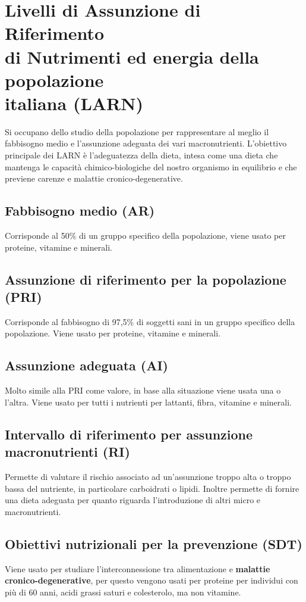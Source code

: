 \documentclass[10pt]{article}
\begin{document}
\section{Livelli di Assunzione di Riferimento\\ di Nutrimenti ed energia della popolazione\\ italiana (LARN)} 
Si occupano dello studio della popolazione per rappresentare al meglio il fabbisogno medio e l'assunzione adeguata dei vari macronutrienti. L'obiettivo principale dei LARN è l'adeguatezza della dieta, intesa come una dieta che mantenga le capacità chimico-biologiche del nostro organismo in equilibrio e che previene carenze e malattie cronico-degenerative.
\subsection{Fabbisogno medio (AR)}
Corrisponde al 50\% di un gruppo specifico della popolazione, viene usato per proteine, vitamine e minerali. 
\subsection{Assunzione di riferimento per la popolazione (PRI)}
Corrisponde al fabbisogno di 97,5\% di soggetti sani in un gruppo specifico della popolazione. Viene usato per proteine, vitamine e minerali. 
\subsection{Assunzione adeguata (AI)}
Molto simile alla PRI come valore, in base alla situazione viene usata una o l'altra. Viene usato per tutti i nutrienti per lattanti, fibra, vitamine e minerali.
\subsection{Intervallo di riferimento per assunzione macronutrienti (RI)}
Permette di valutare il rischio associato ad un'assunzione troppo alta o troppo bassa del nutriente, in particolare carboidrati o lipidi. Inoltre permette di fornire una dieta adeguata per quanto riguarda l'introduzione di altri micro e macronutrienti.
\subsection{Obiettivi nutrizionali per la prevenzione (SDT)}
Viene usato per studiare l'interconnessione tra alimentazione e \textbf{malattie cronico-degenerative}, per questo vengono usati per proteine per individui con più di 60 anni, acidi grassi saturi e colesterolo, ma non vitamine. 
\end{document}

